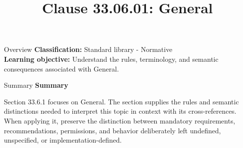 \documentclass[10pt,letterpaper]{article}
\title{Clause 33.06.01: General}
\author{}
\date{}
\begin{document}
\maketitle
\begin{CornellOverviewBox}{Overview}
\textbf{Classification:} Standard library - Normative\\[2pt]
\textbf{Learning objective:} Understand the rules, terminology, and semantic consequences associated with General.
\end{CornellOverviewBox}\begin{CornellSummaryBox}{Summary}
{\sffamily\bfseries\color{Accent} Summary}\par\vspace{3pt}Section 33.6.1 focuses on General. The section supplies the rules and semantic distinctions needed to interpret this topic in context with its cross-references. When applying it, preserve the distinction between mandatory requirements, recommendations, permissions, and behavior deliberately left undefined, unspecified, or implementation-defined.
\end{CornellSummaryBox}
\end{document}
